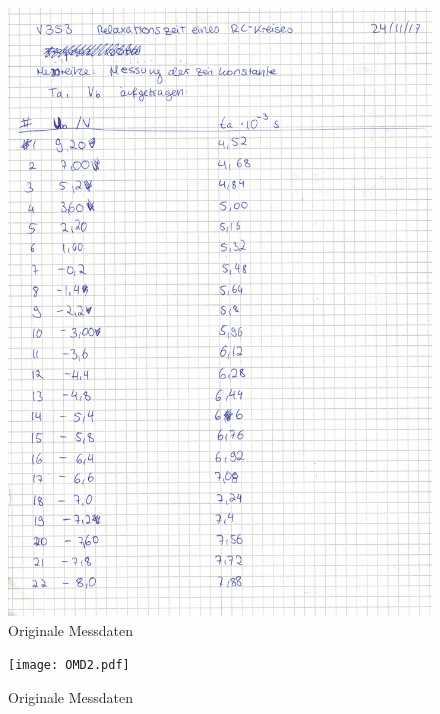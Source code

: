 \begin{figure}
  \centering
  \includegraphics[width=\textwidth]{OMD1.pdf}
  \caption{Originale Messdaten}
  \label{Messung}
\end{figure}

\begin{figure}
  \centering
  \texttt{[image: OMD2.pdf]}
  \caption{Originale Messdaten}
  \label{Messung}
\end{figure}


